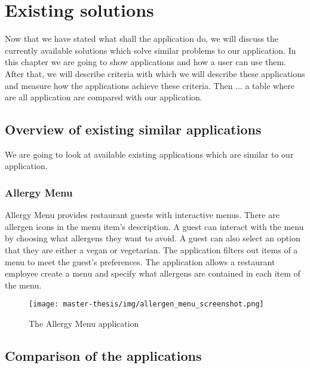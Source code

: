 \chapter{Existing solutions}
Now that we have stated what shall the application do, we will discuss the currently available solutions which solve similar problems to our application.
In this chapter we are going to show applications and how a user can use them.
After that, we will describe criteria with which we will describe these applications and measure how the applications achieve these criteria.
Then ... a table where are all application are compared with our application.

\section{Overview of existing similar applications}
We are going to look at available existing applications which are similar to our application.

\subsection{Allergy Menu}
Allergy Menu provides restaurant guests with interactive menus.
There are allergen icons in the menu item's description.
A guest can interact with the menu by choosing what allergens they want to avoid.
A guest can also select an option that they are either a vegan or vegetarian.
The application filters out items of a menu to meet the guest's preferences.
The application allows a restaurant employee create a menu and specify what allergens are contained in each item of the menu.

\begin{figure}[h]
  \centering
  \texttt{[image: master-thesis/img/allergen\_menu\_screenshot.png]}
  \caption{The Allergy Menu application}
\end{figure}

\section{Comparison of the applications}

